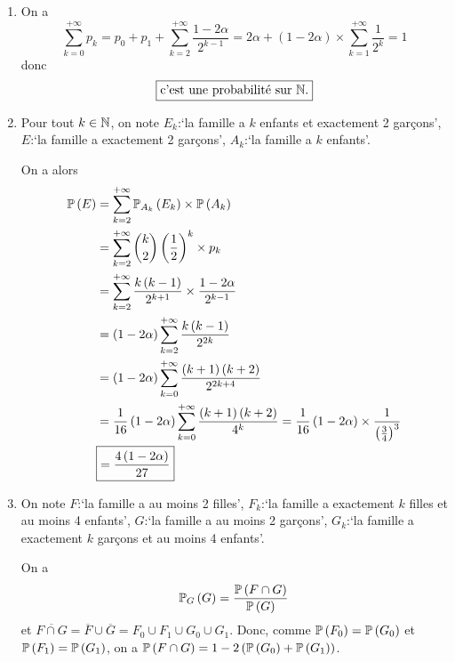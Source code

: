 \begin{solution}
    \phantom{}
    \begin{enumerate}
        \item On a 
        \begin{equation}
            \sum_{k=0}^{+\infty}p_{k}=p_{0}+p_{1}+\sum_{k=2}^{+\infty}\frac{1-2\alpha}{2^{k-1}}=2\alpha+\left(1-2\alpha\right)\times\sum_{k=1}^{+\infty}\frac{1}{2^{k}}=1
        \end{equation}
        donc 
        \begin{equation}
            \boxed{\text{c'est une probabilité sur }\N.}
        \end{equation}

        \item Pour tout $k\in\N$, on note $E_{k}$:`la famille a $k$ enfants et exactement 2 garçons', $E$:`la famille a exactement 2 garçons', $A_{k}$:`la famille a $k$ enfants'.
        
        On a alors 
        \begin{align}
            \P\left(E\right)
            &=\sum_{k=2}^{+\infty}\P_{A_{k}}\left(E_{k}\right)\times\P\left(A_{k}\right)\\
            &=\sum_{k=2}^{+\infty}\binom{k}{2}\left(\frac{1}{2}\right)^{k}\times p_{k}\\
            &=\sum_{k=2}^{+\infty}\frac{k\left(k-1\right)}{2^{k+1}}\times\frac{1-2\alpha}{2^{k-1}}\\
            &=\left(1-2\alpha\right)\sum_{k=2}^{+\infty}\frac{k\left(k-1\right)}{2^{2k}}\\
            &=\left(1-2\alpha\right)\sum_{k=0}^{+\infty}\frac{\left(k+1\right)\left(k+2\right)}{2^{2k+4}}\\
            &=\frac{1}{16}\left(1-2\alpha\right)\sum_{k=0}^{+\infty}\frac{\left(k+1\right)\left(k+2\right)}{4^{k}}=\frac{1}{16}\left(1-2\alpha\right)\times\frac{1}{\left(\frac{3}{4}\right)^{3}}\\
            &\boxed{=\frac{4\left(1-2\alpha\right)}{27}}
        \end{align}

        \item On note $F$:`la famille a au moins 2 filles', $F_{k}$:`la famille a exactement $k$ filles et au moins 4 enfants', $G$:`la famille a au moins 2 garçons', $G_{k}$:`la famille a exactement $k$ garçons et au moins 4 enfants'.
        
        On a 
        \begin{equation}
            \P_{G}\left(G\right)=\frac{\P\left(F\cap G\right)}{\P\left(G\right)}
        \end{equation}
        et $\overline{F\cap G}=\overline{F}\cup\overline{G}=F_{0}\cup F_{1}\cup G_{0}\cup G_{1}$.
        Donc, comme $\P\left(F_{0}\right)=\P\left(G_{0}\right)$ et $\P\left(F_{1}\right)=\P\left(G_{1}\right)$, on a $\P\left(F\cap G\right)=1-2\left(\P\left(G_{0}\right)+\P\left(G_{1}\right)\right)$.


\end{enumerate}
\end{solution}
